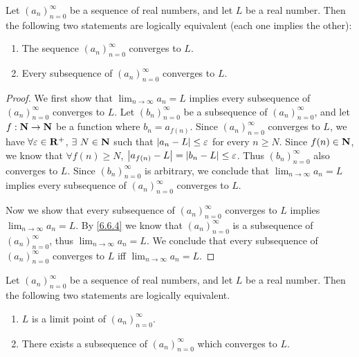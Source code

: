 \begin{proposition}\label{6.6.5}
  Let \((a_n)_{n = 0}^\infty\) be a sequence of real numbers, and let \(L\) be a real number.
  Then the following two statements are logically equivalent (each one implies the other):
  \begin{enumerate}
    \item The sequence \((a_n)_{n = 0}^\infty\) converges to \(L\).
    \item Every subsequence of \((a_n)_{n = 0}^\infty\) converges to \(L\).
  \end{enumerate}
\end{proposition}

\begin{proof}
  We first show that \(\lim_{n \to \infty} a_n = L\) implies every subsequence of \((a_n)_{n = 0}^\infty\) converges to \(L\).
  Let \((b_n)_{n = 0}^\infty\) be a subsequence of \((a_n)_{n = 0}^\infty\), and let \(f : \mathbf{N} \to \mathbf{N}\) be a function where \(b_n = a_{f(n)}\).
  Since \((a_n)_{n = 0}^\infty\) converges to \(L\), we have \(\forall \varepsilon \in \mathbf{R}^+\), \(\exists\ N \in \mathbf{N}\) such that \(\left\lvert a_n - L\right\rvert \leq \varepsilon\) for every \(n \geq N\).
  Since \(f(n) \in \mathbf{N}\), we know that \(\forall f(n) \geq N\), \(\left\lvert a_{f(n)} - L\right\rvert = \left\lvert b_n - L\right\rvert \leq \varepsilon\).
  Thus \((b_n)_{n = 0}^\infty\) also converges to \(L\).
  Since \((b_n)_{n = 0}^\infty\) is arbitrary, we conclude that \(\lim_{n \to \infty} a_n = L\) implies every subsequence of \((a_n)_{n = 0}^\infty\) converges to \(L\).

  Now we show that every subsequence of \((a_n)_{n = 0}^\infty\) converges to \(L\) implies \(\lim_{n \to \infty} a_n = L\).
  By \cref{6.6.4} we know that \((a_n)_{n = 0}^\infty\) is a subsequence of \((a_n)_{n = 0}^\infty\), thus \(\lim_{n \to \infty} a_n = L\).
  We conclude that every subsequence of \((a_n)_{n = 0}^\infty\) converges to \(L\) iff \(\lim_{n \to \infty} a_n = L\).
\end{proof}

\begin{proposition}\label{6.6.6}
  Let \((a_n)_{n = 0}^\infty\) be a sequence of real numbers, and let \(L\) be a real number.
  Then the following two statements are logically equivalent.
  \begin{enumerate}
    \item \(L\) is a limit point of \((a_n)_{n = 0}^\infty\).
    \item There exists a subsequence of \((a_n)_{n = 0}^\infty\) which converges to \(L\).
  \end{enumerate}
\end{proposition}


